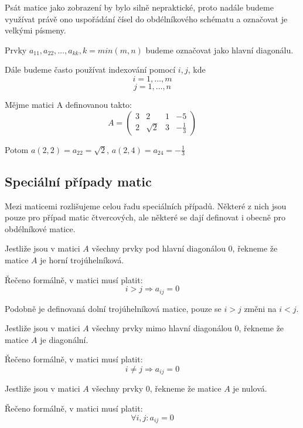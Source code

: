 Psát matice jako zobrazení by bylo silně nepraktické, proto nadále budeme využívat
právě ono uspořádání čísel do obdélníkového schématu a označovat je velkými písmeny.

Prvky $a_{11}, a_{22}, \ldots, a_{kk}, k = min(m, n)$ budeme označovat jako hlavní
diagonálu.

Dále budeme často používat indexování pomocí $i, j$, kde
$$i = 1, \ldots, m$$
$$j = 1, \ldots, n$$

\begin{example}[Matice]

    Mějme matici A definovanou takto:
    $$ A = \begin{pmatrix}
        3 & 2 & 1 & -5 \\
        2 & \sqrt{2} & 3 & -\frac{1}{3}
        \end{pmatrix}  $$

    Potom $a(2, 2) = a_{22} = \sqrt{2}$, $a(2, 4) = a_{24} = -\frac{1}{3}$
\end{example}

\subsection{Speciální případy matic}
Mezi maticemi rozlišujeme celou řadu speciálních případů. Některé z nich jsou pouze
pro případ matic čtvercových, ale některé se dají definovat i obecně pro obdélníkové matice.

\begin{definition}
    Jestliže jsou v matici $A$ všechny prvky pod hlavní diagonálou 0,
    řekneme že matice $A$ je horní trojúhelníková.

    Řečeno formálně, v matici musí platit:
    $$i > j \Rightarrow a_{ij} = 0$$

    Podobně je definovaná dolní trojúhelníková matice, pouze se $i > j$ změni na $i < j$.
\end{definition}

\begin{definition}
    Jestliže jsou v matici $A$ všechny prvky mimo hlavní diagonálou 0,
    řekneme že matice $A$ je diagonální.

    Řečeno formálně, v matici musí platit:
    $$i \neq j \Rightarrow a_{ij} = 0$$
\end{definition}

\begin{definition}
    Jestliže jsou v matici $A$ všechny prvky 0,
    řekneme že matice $A$ je nulová.

    Řečeno formálně, v matici musí platit:
    $$\forall i,j: a_{ij} = 0$$
\end{definition}

